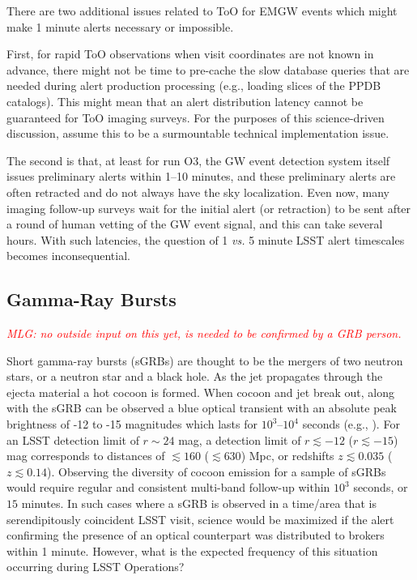 \documentclass[DM,lsstdraft,authoryear,toc]{lsstdoc}
\begin{document}
There are two additional issues related to ToO for EMGW events which might make 1 minute alerts necessary or impossible. 

First, for rapid ToO observations when visit coordinates are not known in advance, there might not be time to pre-cache the slow database queries that are needed during alert production processing (e.g., loading slices of the PPDB catalogs).
This might mean that an alert distribution latency cannot be guaranteed for ToO imaging surveys. 
For the purposes of this science-driven discussion, assume this to be a surmountable technical implementation issue.

The second is that, at least for run O3, the GW event detection system itself issues preliminary alerts within 1--10 minutes, and these preliminary alerts are often retracted and do not always have the sky localization.
Even now, many imaging follow-up surveys wait for the initial alert (or retraction) to be sent after a round of human vetting of the GW event signal, and this can take several hours.
With such latencies, the question of 1 {\it vs.} 5 minute LSST alert timescales becomes inconsequential. 

\subsection{Gamma-Ray Bursts}\label{ssec:latency_grb}

{\it \textcolor{red}{MLG: no outside input on this yet, is needed to be confirmed by a GRB person.} }

Short gamma-ray bursts (sGRBs) are thought to be the mergers of two neutron stars, or a neutron star and a black hole.
As the jet propagates through the ejecta material a hot cocoon is formed.
When cocoon and jet break out, along with the sGRB can be observed a blue optical transient with an absolute peak brightness of -12 to -15 magnitudes which lasts for $10^3$--$10^4$ seconds (e.g., \citealt{2018MNRAS.473..576G}).
For an LSST detection limit of $r\sim24$ mag, a detection limit of $r\lesssim-12$ ($r\lesssim-15$) mag corresponds to distances of $\lesssim160$ ($\lesssim630$) Mpc, or redshifts $z\lesssim0.035$ ($z\lesssim0.14$).
Observing the diversity of cocoon emission for a sample of sGRBs would require regular and consistent multi-band follow-up within $10^3$ seconds, or $15$ minutes.
In such cases where a sGRB is observed in a time/area that is serendipitously coincident LSST visit, science would be maximized if the alert confirming the presence of an optical counterpart was distributed to brokers within 1 minute.
However, what is the expected frequency of this situation occurring during LSST Operations?
\end{document}
